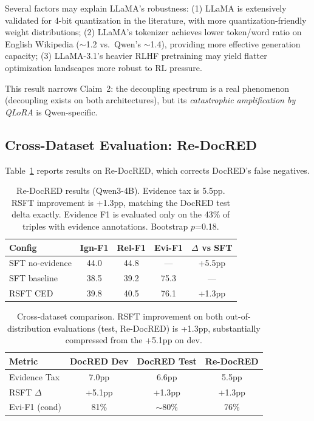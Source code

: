 \documentclass[11pt,a4paper]{article}
\newcommand{\ced}{CED}
\begin{document}
Several factors may explain LLaMA's robustness: (1) LLaMA is extensively validated for 4-bit quantization in the literature, with more quantization-friendly weight distributions; (2) LLaMA's tokenizer achieves lower token/word ratio on English Wikipedia ($\sim$1.2 vs.\ Qwen's $\sim$1.4), providing more effective generation capacity; (3) LLaMA-3.1's heavier RLHF pretraining may yield flatter optimization landscapes more robust to RL pressure.

This result narrows Claim~2: the decoupling spectrum is a real phenomenon (decoupling exists on both architectures), but its \emph{catastrophic amplification by QLoRA} is Qwen-specific.

\subsection{Cross-Dataset Evaluation: Re-DocRED}
\label{sec:redocred}

Table~\ref{tab:redocred} reports results on Re-DocRED, which corrects DocRED's false negatives.

\begin{table}[t]
\centering
\small
\begin{tabular}{lcccc}
\toprule
\textbf{Config} & \textbf{Ign-F1} & \textbf{Rel-F1} & \textbf{Evi-F1} & \textbf{$\Delta$ vs SFT} \\
\midrule
SFT no-evidence & 44.0 & 44.8 & --- & +5.5pp \\
SFT baseline & 38.5 & 39.2 & 75.3 & --- \\
RSFT \ced{} & 39.8 & 40.5 & 76.1 & +1.3pp \\
\bottomrule
\end{tabular}
\caption{Re-DocRED results (Qwen3-4B). Evidence tax is 5.5pp. RSFT improvement is +1.3pp, matching the DocRED test delta exactly. Evidence F1 is evaluated only on the 43\% of triples with evidence annotations. Bootstrap $p$=0.18.}
\label{tab:redocred}
\end{table}

\begin{table}[t]
\centering
\small
\begin{tabular}{lccc}
\toprule
\textbf{Metric} & \textbf{DocRED Dev} & \textbf{DocRED Test} & \textbf{Re-DocRED} \\
\midrule
Evidence Tax & 7.0pp & 6.6pp & 5.5pp \\
RSFT $\Delta$ & +5.1pp & +1.3pp & +1.3pp \\
Evi-F1 (cond) & 81\% & $\sim$80\% & 76\% \\
\bottomrule
\end{tabular}
\caption{Cross-dataset comparison. RSFT improvement on both out-of-distribution evaluations (test, Re-DocRED) is +1.3pp, substantially compressed from the +5.1pp on dev.}
\label{tab:cross_dataset}
\end{table}
\end{document}
